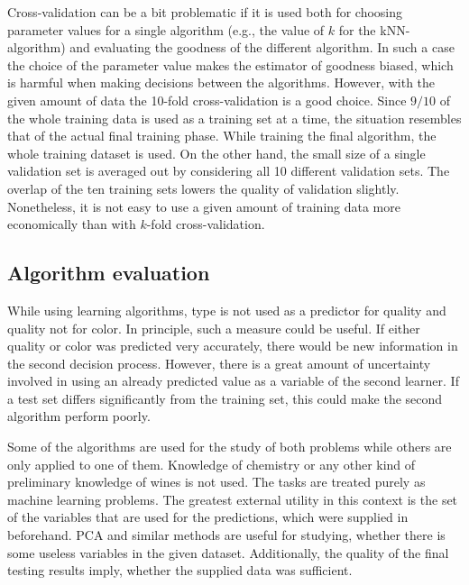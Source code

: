 \documentclass[twoside]{article}
\begin{document}
\begin{multicols}{2}
Cross-validation can be a bit problematic if it is used both for choosing parameter values for a single algorithm (e.g., the value of $k$
for the kNN-algorithm) and evaluating the goodness of the different algorithm. In such a case the choice of the parameter value makes the estimator
of goodness biased, which is harmful when making decisions between the algorithms. However, with the given amount of data
the 10-fold cross-validation is a good choice. Since $9/10$ of the whole training data is used as a training set at a time,
the situation resembles that of the actual final training phase. While training the final algorithm, the whole training dataset
is used. On the other hand, the small size of a single validation set is averaged out by considering all 10 different validation sets.
The overlap of the ten training sets lowers the quality of validation slightly. Nonetheless, it is not easy to use a given amount
of training data more economically than with $k$-fold cross-validation.

\subsection{Algorithm evaluation}

While using learning algorithms, type is not used as a predictor for quality and quality not for color.
In principle, such a measure could be useful. If either quality or color was predicted very
accurately, there would be new information in the second decision process.
However, there is a great amount of uncertainty involved in using an already predicted value as a
variable of the second learner. If a test set differs significantly from the training set, this could
make the second algorithm perform poorly.

Some of the algorithms are used for the study of both problems while others are only applied to one of them.
Knowledge of chemistry or any other kind of preliminary knowledge of wines is not used. The tasks are treated purely as machine learning
problems. The greatest external utility in this context is the set of the variables that are used for the predictions,
which were supplied in beforehand. PCA and similar methods are useful
for studying, whether there is some useless variables in the given dataset. Additionally, the quality of the final testing results imply, whether the supplied
data was sufficient.


\end{multicols}
\end{document}
